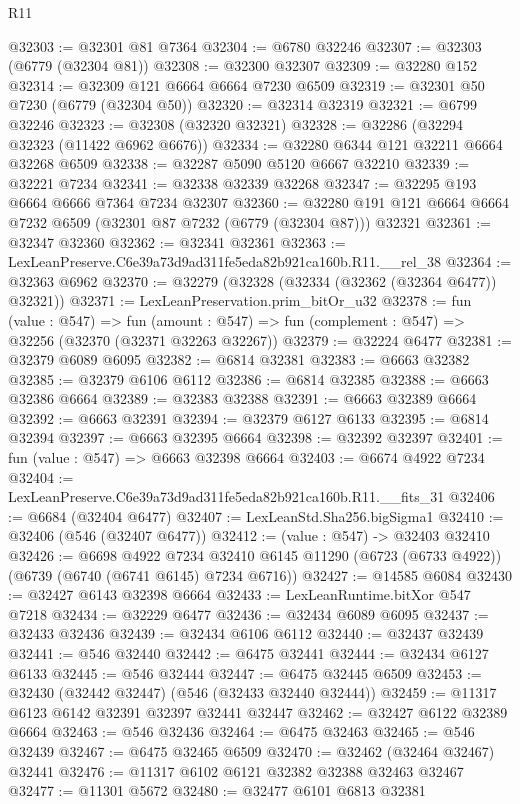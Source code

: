 \begin{lexlean}{R11}
\begin{coremodule}
@32303 := @32301 @81 @7364
@32304 := @6780 @32246
@32307 := @32303 (@6779 (@32304 @81))
@32308 := @32300 @32307
@32309 := @32280 @152
@32314 := @32309 @121 @6664 @6664 @7230 @6509
@32319 := @32301 @50 @7230 (@6779 (@32304 @50))
@32320 := @32314 @32319
@32321 := @6799 @32246
@32323 := @32308 (@32320 @32321)
@32328 := @32286 (@32294 @32323 (@11422 @6962 @6676))
@32334 := @32280 @6344 @121 @32211 @6664 @32268 @6509
@32338 := @32287 @5090 @5120 @6667 @32210
@32339 := @32221 @7234
@32341 := @32338 @32339 @32268
@32347 := @32295 @193 @6664 @6666 @7364 @7234 @32307
@32360 := @32280 @191 @121 @6664 @6664 @7232 @6509 (@32301 @87 @7232 (@6779 (@32304 @87))) @32321
@32361 := @32347 @32360
@32362 := @32341 @32361
@32363 := LexLeanPreserve.C6e39a73d9ad311fe5eda82b921ca160b.R11.__rel_38
@32364 := @32363 @6962
@32370 := @32279 (@32328 (@32334 (@32362 (@32364 @6477)) @32321))
@32371 := LexLeanPreservation.prim_bitOr_u32
@32378 := fun (value : @547) =>
  fun (amount : @547) => fun (complement : @547) => @32256 (@32370 (@32371 @32263 @32267))
@32379 := @32224 @6477
@32381 := @32379 @6089 @6095
@32382 := @6814 @32381
@32383 := @6663 @32382
@32385 := @32379 @6106 @6112
@32386 := @6814 @32385
@32388 := @6663 @32386 @6664
@32389 := @32383 @32388
@32391 := @6663 @32389 @6664
@32392 := @6663 @32391
@32394 := @32379 @6127 @6133
@32395 := @6814 @32394
@32397 := @6663 @32395 @6664
@32398 := @32392 @32397
@32401 := fun (value : @547) => @6663 @32398 @6664
@32403 := @6674 @4922 @7234
@32404 := LexLeanPreserve.C6e39a73d9ad311fe5eda82b921ca160b.R11.__fits_31
@32406 := @6684 (@32404 @6477)
@32407 := LexLeanStd.Sha256.bigSigma1
@32410 := @32406 (@546 (@32407 @6477))
@32412 := (value : @547) -> @32403 @32410
@32426 := @6698
    @4922
    @7234
    @32410
    @6145
    @11290
    (@6723 (@6733 @4922))
    (@6739 (@6740 (@6741 @6145) @7234 @6716))
@32427 := @14585 @6084
@32430 := @32427 @6143 @32398 @6664
@32433 := LexLeanRuntime.bitXor @547 @7218
@32434 := @32229 @6477
@32436 := @32434 @6089 @6095
@32437 := @32433 @32436
@32439 := @32434 @6106 @6112
@32440 := @32437 @32439
@32441 := @546 @32440
@32442 := @6475 @32441
@32444 := @32434 @6127 @6133
@32445 := @546 @32444
@32447 := @6475 @32445 @6509
@32453 := @32430 (@32442 @32447) (@546 (@32433 @32440 @32444))
@32459 := @11317 @6123 @6142 @32391 @32397 @32441 @32447
@32462 := @32427 @6122 @32389 @6664
@32463 := @546 @32436
@32464 := @6475 @32463
@32465 := @546 @32439
@32467 := @6475 @32465 @6509
@32470 := @32462 (@32464 @32467) @32441
@32476 := @11317 @6102 @6121 @32382 @32388 @32463 @32467
@32477 := @11301 @5672
@32480 := @32477 @6101 @6813 @32381

\end{coremodule}
\end{lexlean}
